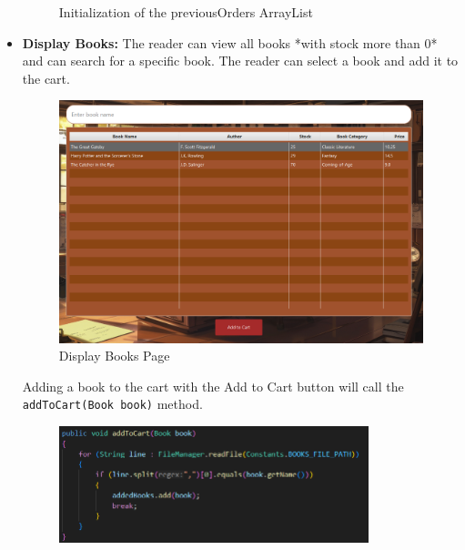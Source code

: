 \documentclass[a4paper,14pt]{extarticle}
\begin{document}
\begin{itemize}
    \begin{figure}[H]
    \centering
        \caption{Initialization of the previousOrders ArrayList}
\end{figure}
\newpage
    \item \textbf{Display Books:} The reader can view all books *with stock more than 0* and can search for a specific book. The reader can select a book and add it to the cart.
    \begin{figure}[H]
        \centering
        \includegraphics[width=\textwidth]{Media/Display Books.png}
        \caption{Display Books Page}
    \end{figure}
    Adding a book to the cart with the Add to Cart button will call the 
    \texttt{add\-To\-Cart(Book book)} method.
    \begin{figure}[H]
        \centering
        \includegraphics[width=0.85\textwidth]{Media/addToCart.png}

\end{figure}
\end{itemize}
\end{document}
